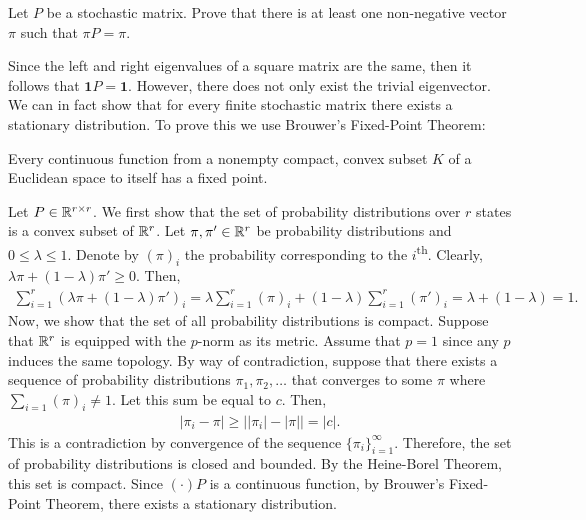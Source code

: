 \begin{problem}{1}
    Let $P$ be a stochastic matrix. Prove that there is at least one non-negative vector $\pi$ such that $\pi P = \pi$. 
\end{problem}
\begin{solution}
    Since the left and right eigenvalues of a square matrix are the same, then it follows that $\mathbf{1}P = \mathbf{1}$. However, there does not only exist the trivial eigenvector. We can in fact show that for every finite stochastic matrix there exists a stationary distribution. To prove this we use Brouwer's Fixed-Point Theorem:
    \begin{theorem}
        Every continuous function from a nonempty compact, convex subset $K$ of a Euclidean space to itself has a fixed point.
    \end{theorem}
    Let $P \in \mathbb{R}^{r\times r}$. We first show that the set of probability distributions over $r$ states is a convex subset of $\mathbb{R}^r$. Let $\pi, \pi' \in \mathbb{R}^r$ be probability distributions and $0 \leq \lambda \leq 1$. Denote by $(\pi)_i$ the probability corresponding to the $i$\textsuperscript{th}. Clearly, $\lambda \pi + (1-\lambda) \pi' \geq 0$.
    Then, 
    \begin{align*}
        \sum_{i=1}^r \left(\lambda\pi + (1-\lambda)\pi'\right)_i = \lambda \sum_{i=1}^r (\pi)_i + (1-\lambda)\sum_{i=1}^r (\pi')_i = \lambda + (1-\lambda) = 1.
    \end{align*}
    Now, we show that the set of all probability distributions is compact. Suppose that $\mathbb{R}^r$ is equipped with the $p$-norm as its metric. Assume that $p=1$ since any $p$ induces the same topology. By way of contradiction, suppose that there exists a sequence of probability distributions $\pi_1,\pi_2,\ldots$ that converges to some $\pi$ where $\sum_{i=1} (\pi)_i \neq 1$. Let this sum be equal to $c$. Then, 
    \begin{align*}
        |\pi_i - \pi| \geq \left||\pi_i| - |\pi|\right| = |c|.
    \end{align*}
    This is a contradiction by convergence of the sequence $\{\pi_i\}_{i=1}^\infty$. Therefore, the set of probability distributions is closed and bounded. By the Heine-Borel Theorem, this set is compact. Since $(\cdot)P$ is a continuous function, by Brouwer's Fixed-Point Theorem, there exists a stationary distribution.
\end{solution}

